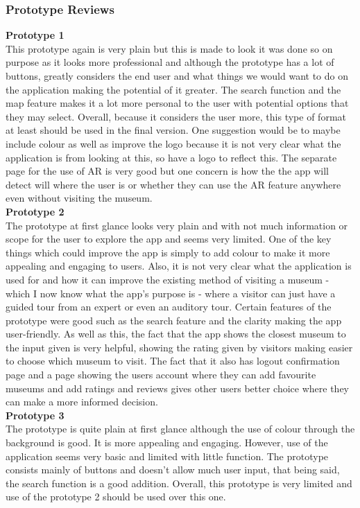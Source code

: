 \newpage
\subsubsection{Prototype Reviews}
\textbf{Prototype 1}\\
This prototype again is very plain but this is made to look it was done so on purpose as it looks more professional and although the prototype has a lot of buttons, greatly considers the end user and what things we would want to do on the application making the potential of it greater. The search function and the map feature makes it a lot more personal to the user with potential options that they may select. Overall, because it considers the user more, this type of format at least should be used in the final version. One suggestion would be to maybe include colour as well as improve the logo because it is not very clear what the application is from looking at this, so have a logo to reflect this. The separate page for the use of AR is very good but one concern is how the the app will detect will where the user is or whether they can use the AR feature anywhere even without visiting the museum.\\

\textbf{Prototype 2}\\
The prototype at first glance looks very plain and with not much information or scope for the user to explore the app and seems very limited. One of the key things which could improve the app is simply to add colour to make it more appealing and engaging to users. Also, it is not very clear what the application is used for and how it can improve the existing method of visiting a museum - which I now know what the app’s purpose is - where a visitor can just have a guided tour from an expert or even an auditory tour. Certain features of the prototype were good such as the search feature and the clarity making the app user-friendly. As well as this, the fact that the app shows the closest museum to the input given is very helpful, showing the rating given by visitors making easier to choose which museum to visit. The fact that it also has logout confirmation page and a page showing the users account where they can add favourite museums and add ratings and reviews gives other users better choice where they can make a more informed decision.\\

\textbf{Prototype 3}\\
The prototype is quite plain at first glance although the use of colour through the background is good. It is more appealing and engaging. However, use of the application seems very basic and limited with little function. The prototype consists mainly of buttons and doesn’t allow much user input, that being said, the search function is a good addition. Overall, this prototype is very limited and use of the prototype 2 should be used over this one.

